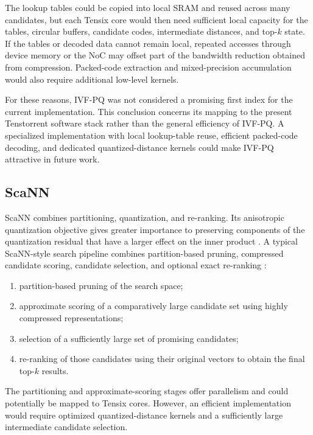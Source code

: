 The lookup tables could be copied into local SRAM and reused across many candidates, but each Tensix core would then need sufficient local capacity for the tables, circular buffers, candidate codes, intermediate distances, and top-\(k\) state. If the tables or decoded data cannot remain local, repeated accesses through device memory or the NoC may offset part of the bandwidth reduction obtained from compression. Packed-code extraction and mixed-precision accumulation would also require additional low-level kernels.

For these reasons, IVF-PQ was not considered a promising first index for the current implementation. This conclusion concerns its mapping to the present Tenstorrent software stack rather than the general efficiency of IVF-PQ. A specialized implementation with local lookup-table reuse, efficient packed-code decoding, and dedicated quantized-distance kernels could make IVF-PQ attractive in future work.

\subsection{ScaNN}
\label{subsec:scann-tt-fit}

ScaNN combines partitioning, quantization, and re-ranking. Its anisotropic quantization objective gives greater importance to preserving components of the quantization residual that have a larger effect on the inner product \cite{scann}.
\newline
A typical ScaNN-style search pipeline combines partition-based pruning, compressed candidate scoring, candidate selection, and optional exact re-ranking \cite{scann}:
\begin{enumerate}
\item partition-based pruning of the search space;
\item approximate scoring of a comparatively large candidate set using highly compressed representations;
\item selection of a sufficiently large set of promising candidates;
\item re-ranking of those candidates using their original vectors to obtain the final top-\(k\) results.
\end{enumerate}

The partitioning and approximate-scoring stages offer parallelism and could potentially be mapped to Tensix cores. However, an efficient implementation would require optimized quantized-distance kernels and a sufficiently large intermediate candidate selection.

